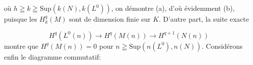 \begin{center}
\end{center}
où $h \geqq k \geqq \mathrm{Sup}(k(N), k(L^0))$, on démontre (a), d'où évidemment (b), puisque les $H_k^q(M)$ sont de dimension finie sur $K$. D'autre part, la suite exacte

\begin{equation*}
H^q(L^0(n)) \to H^q(M(n)) \to H^{q+1}(N(n))
\end{equation*}
montre que $H^q(M(n)) = 0$ pour $n \geqq \mathrm{Sup}(n(L^0), n(N))$. Considérons enfin le diagramme commutatif:

\begin{center}
\end{center}



